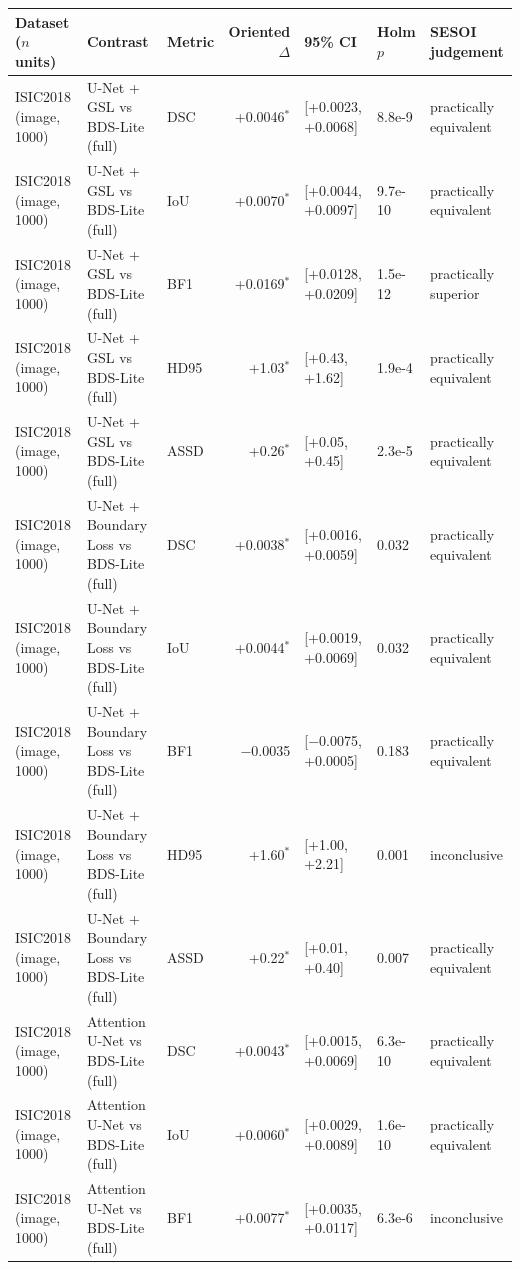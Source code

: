\begin{tabular}{lllrlll}
\toprule
Dataset ($n$ units) & Contrast & Metric & Oriented $\Delta$ & 95\% CI & Holm $p$ & SESOI judgement \\
\midrule
ISIC2018 (image, 1000) & U-Net + GSL vs BDS-Lite (full) & DSC & +0.0046$^{*}$ & [+0.0023, +0.0068] & 8.8e-9 & practically equivalent \\
ISIC2018 (image, 1000) & U-Net + GSL vs BDS-Lite (full) & IoU & +0.0070$^{*}$ & [+0.0044, +0.0097] & 9.7e-10 & practically equivalent \\
ISIC2018 (image, 1000) & U-Net + GSL vs BDS-Lite (full) & BF1 & +0.0169$^{*}$ & [+0.0128, +0.0209] & 1.5e-12 & practically superior \\
ISIC2018 (image, 1000) & U-Net + GSL vs BDS-Lite (full) & HD95 & +1.03$^{*}$ & [+0.43, +1.62] & 1.9e-4 & practically equivalent \\
ISIC2018 (image, 1000) & U-Net + GSL vs BDS-Lite (full) & ASSD & +0.26$^{*}$ & [+0.05, +0.45] & 2.3e-5 & practically equivalent \\
ISIC2018 (image, 1000) & U-Net + Boundary Loss vs BDS-Lite (full) & DSC & +0.0038$^{*}$ & [+0.0016, +0.0059] & 0.032 & practically equivalent \\
ISIC2018 (image, 1000) & U-Net + Boundary Loss vs BDS-Lite (full) & IoU & +0.0044$^{*}$ & [+0.0019, +0.0069] & 0.032 & practically equivalent \\
ISIC2018 (image, 1000) & U-Net + Boundary Loss vs BDS-Lite (full) & BF1 & $-$0.0035 & [$-$0.0075, +0.0005] & 0.183 & practically equivalent \\
ISIC2018 (image, 1000) & U-Net + Boundary Loss vs BDS-Lite (full) & HD95 & +1.60$^{*}$ & [+1.00, +2.21] & 0.001 & inconclusive \\
ISIC2018 (image, 1000) & U-Net + Boundary Loss vs BDS-Lite (full) & ASSD & +0.22$^{*}$ & [+0.01, +0.40] & 0.007 & practically equivalent \\
ISIC2018 (image, 1000) & Attention U-Net vs BDS-Lite (full) & DSC & +0.0043$^{*}$ & [+0.0015, +0.0069] & 6.3e-10 & practically equivalent \\
ISIC2018 (image, 1000) & Attention U-Net vs BDS-Lite (full) & IoU & +0.0060$^{*}$ & [+0.0029, +0.0089] & 1.6e-10 & practically equivalent \\
ISIC2018 (image, 1000) & Attention U-Net vs BDS-Lite (full) & BF1 & +0.0077$^{*}$ & [+0.0035, +0.0117] & 6.3e-6 & inconclusive \\

\end{tabular}
